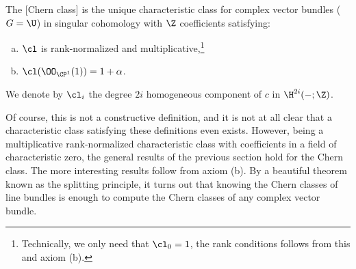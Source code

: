 \begin{definition}
	The [Chern class] is the unique characteristic class for complex vector bundles ($G=\U$) in singular cohomology with $\Z$ coefficients satisfying:
	\begin{enumerate}[(a)]
		\item $\cl$ is rank-normalized and multiplicative,\footnote{Technically, we only need that $\cl_0=1$, the rank conditions follows from this and axiom (b).}
		\item $\cl(\OO_{\CP^1}(1))=1+\alpha$.
	\end{enumerate}
	We denote by $\cl_i$ the degree $2i$ homogeneous component of $c$ in $\H^{2i}(-;\Z)$.
\end{definition}

Of course, this is not a constructive definition, and it is not at all clear that a characteristic class satisfying these definitions even exists.
However, being a multiplicative rank-normalized characteristic class with coefficients in a field of characteristic zero, the general results of the previous section hold for the Chern class. The more interesting results follow from axiom (b). By a beautiful theorem known as the splitting principle, it turns out that knowing the Chern classes of line bundles is enough to compute the Chern classes of any complex vector bundle.

